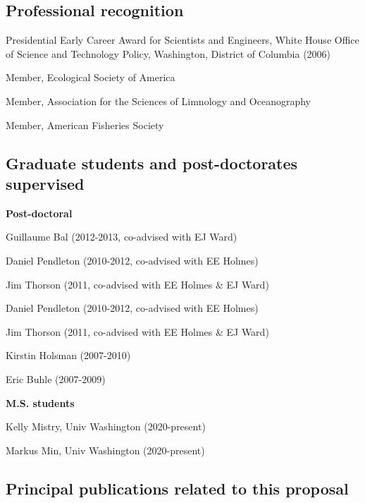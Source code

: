 \documentclass[
]{article}
\begin{document}
\hypertarget{professional-recognition}{%
\subsection{Professional recognition}\label{professional-recognition}}

\vspace{-5pt}

Presidential Early Career Award for Scientists and Engineers, White
House Office of Science and Technology Policy, Washington, District of
Columbia (2006)

Member, Ecological Society of America

Member, Association for the Sciences of Limnology and Oceanography

Member, American Fisheries Society

\hypertarget{graduate-students-and-post-doctorates-supervised}{%
\subsection{Graduate students and post-doctorates
supervised}\label{graduate-students-and-post-doctorates-supervised}}

\vspace{-5pt}

\textbf{Post-doctoral}

\quad Guillaume Bal (2012-2013, co-advised with EJ Ward)

\quad Daniel Pendleton (2010-2012, co-advised with EE Holmes)

\quad Jim Thorson (2011, co-advised with EE Holmes \& EJ Ward)

\quad Daniel Pendleton (2010-2012, co-advised with EE Holmes)

\quad Jim Thorson (2011, co-advised with EE Holmes \& EJ Ward)

\quad Kirstin Holsman (2007-2010)

\quad Eric Buhle (2007-2009)

\textbf{M.S. students}

\quad Kelly Mistry, Univ Washington (2020-present)

\quad Markus Min, Univ Washington (2020-present)

\hypertarget{principal-publications-related-to-this-proposal}{%
\subsection{Principal publications related to this
proposal}\label{principal-publications-related-to-this-proposal}}
\end{document}
